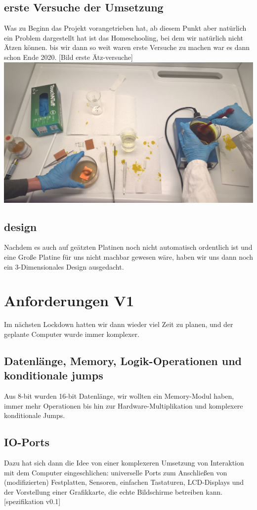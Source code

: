 \documentclass{scrartcl}
\begin{document}
    \subsection{erste Versuche der Umsetzung}
    Was zu Beginn das Projekt vorangetrieben hat, ab diesem Punkt aber natürlich ein Problem dargestellt hat ist das Homeschooling, bei dem wir natürlich nicht Ätzen können.
    bis wir dann so weit waren erste Versuche zu machen war es dann schon Ende 2020. [Bild erste Ätz-versuche]
    \includegraphics{Handy/WP_20210704_20_40_03_Pro} %

    \subsection{design}
    Nachdem es auch auf geätzten Platinen noch nicht automatisch ordentlich ist und eine Große Platine für uns nicht machbar gewesen wäre, haben wir uns dann noch ein 3-Dimensionales Design ausgedacht.

    \section{Anforderungen V1}
    Im nächsten Lockdown hatten wir dann wieder viel Zeit zu planen, und der geplante Computer wurde immer komplexer.
    \subsection{Datenlänge, Memory, Logik-Operationen und konditionale jumps}

    Aus 8-bit wurden 16-bit Datenlänge, wir wollten ein Memory-Modul haben, immer mehr Operationen bis hin zur Hardware-Multiplikation und komplexere konditionale Jumps.
    \subsection{IO-Ports}
    Dazu hat sich dann die Idee von einer komplexeren Umsetzung von Interaktion mit dem Computer eingeschlichen:
    universelle Ports zum Anschließen von (modifizierten) Festplatten, Sensoren, einfachen Tastaturen, LCD-Displays und der Vorstellung einer Grafikkarte, die echte Bildschirme betreiben kann.
    [spezifikation v0.1]
\end{document}
